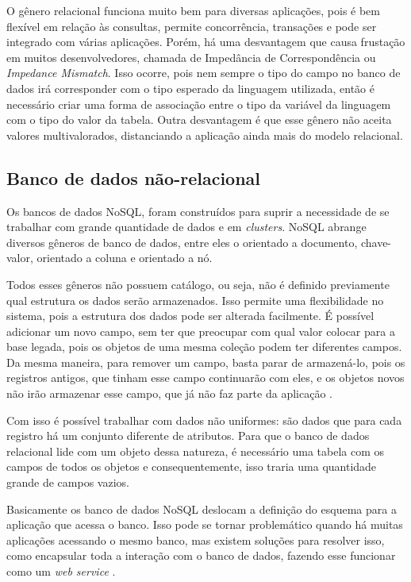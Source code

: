 O gênero relacional funciona muito bem para diversas aplicações, pois é bem flexível em relação às consultas, permite concorrência, transações e pode ser integrado com várias aplicações. Porém, há uma desvantagem que causa frustação em muitos desenvolvedores, chamada de Impedância de Correspondência ou \textit{Impedance Mismatch}. Isso ocorre, pois nem sempre o tipo do campo no banco de dados irá corresponder com o tipo esperado da linguagem utilizada, então é necessário criar uma forma de associação entre o tipo da variável da linguagem com o tipo do valor da tabela. Outra desvantagem é que esse gênero não aceita valores multivalorados, distanciando a aplicação ainda mais do modelo relacional.


\subsection{Banco de dados não-relacional}
\label{subsec:nosqldatabasetype}
Os bancos de dados NoSQL, foram construídos para suprir a necessidade de se trabalhar com grande quantidade de dados e em \textit{clusters}. NoSQL abrange diversos gêneros de banco de dados, entre eles o orientado a documento, chave-valor, orientado a coluna e orientado a nó.

Todos esses gêneros não possuem catálogo, ou seja, não é definido previamente qual estrutura os dados serão armazenados. Isso permite uma flexibilidade no sistema, pois a estrutura dos dados pode ser alterada facilmente. É possível adicionar um novo campo, sem ter que preocupar com qual valor colocar para a base legada, pois os objetos de uma mesma coleção podem ter diferentes campos. Da mesma maneira, para remover um campo, basta parar de armazená-lo, pois os registros antigos, que tinham esse campo continuarão com eles, e os objetos novos não irão armazenar esse campo, que já não faz parte da aplicação \cite{NoSQL}.

Com isso é possível trabalhar com dados não uniformes: são dados que para cada registro há um conjunto diferente de atributos. Para que o banco de dados relacional lide com um objeto dessa natureza, é necessário uma tabela com os campos de todos os objetos e consequentemente, isso traria uma quantidade grande de campos vazios.

Basicamente os banco de dados NoSQL deslocam a definição do esquema para a aplicação que acessa o banco. Isso pode se tornar problemático quando há muitas aplicações acessando o mesmo banco, mas existem soluções para resolver isso, como encapsular toda a interação com o banco de dados, fazendo esse funcionar como um \textit{web service} \cite{NoSQL}.

